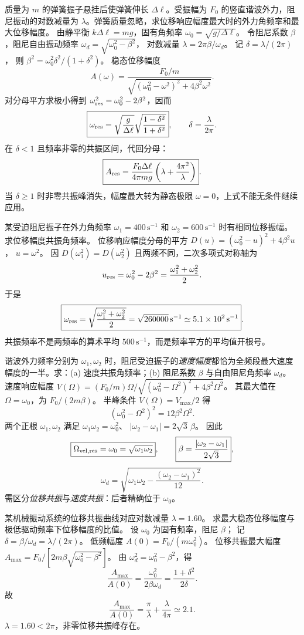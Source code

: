 质量为 $m$ 的弹簧振子悬挂后使弹簧伸长 $\Delta\ell$。受振幅为 $F_0$ 的竖直谐波外力，阻尼振动的对数减量为 $\lambda$。弹簧质量忽略，求位移响应幅度最大时的外力角频率和最大位移幅度。
\exsolution
由静平衡 $k\Delta\ell=mg$，固有角频率
$\omega_0=\sqrt{g/\Delta\ell}$。
令阻尼系数 $\beta$，阻尼自由振动频率
$\omega_d=\sqrt{\omega_0^2-\beta^2}$，
对数减量
$\lambda=2\pi\beta/\omega_d$。
记 $\delta=\lambda/(2\pi)$，
则
$\beta^2=\omega_0^2\delta^2/(1+\delta^2)$。
稳态位移幅度
\[
A(\omega)=\frac{F_0/m}
{\sqrt{(\omega_0^2-\omega^2)^2+4\beta^2\omega^2}}.
\]
对分母平方求极小得到
$\omega_{\rm res}^2=\omega_0^2-2\beta^2$，因而
\[
\boxed{\omega_{\rm res}=
\sqrt{\frac{g}{\Delta\ell}}
\sqrt{\frac{1-\delta^2}{1+\delta^2}}},
\qquad \delta=\frac{\lambda}{2\pi}.
\]
在 $\delta<1$ 且频率非零的共振区间，代回分母：
\[
\boxed{A_{\rm res}
=\frac{F_0\Delta\ell}{4\pi mg}
\left(\lambda+\frac{4\pi^2}{\lambda}\right)}.
\]
\excheck 当 $\delta\ge1$ 时非零共振峰消失，幅度最大转为静态极限 $\omega=0$，上式不能无条件继续应用。

某受迫阻尼振子在外力角频率 $\omega_1=400\,\mathrm{s^{-1}}$ 和
$\omega_2=600\,\mathrm{s^{-1}}$ 时有相同位移振幅。求位移幅度共振角频率。
\exsolution
位移响应幅度分母的平方
$D(u)=(\omega_0^2-u)^2+4\beta^2u$，
$u=\omega^2$。
因 $D(\omega_1^2)=D(\omega_2^2)$ 且两频不同，二次多项式对称轴为
\[
u_{\rm res}=\omega_0^2-2\beta^2
=\frac{\omega_1^2+\omega_2^2}{2}.
\]
于是
\[
\boxed{\omega_{\rm res}=
\sqrt{\frac{\omega_1^2+\omega_2^2}{2}}
=\sqrt{260000}\,\mathrm{s^{-1}}
\simeq5.1\times10^2\,\mathrm{s^{-1}}}.
\]
\excheck 共振频率不是两频率的算术平均 $500\,\mathrm{s^{-1}}$，而是频率平方的平均值开根号。

谐波外力频率分别为 $\omega_1,\omega_2$ 时，阻尼受迫振子的\emph{速度幅度}都恰为全频段最大速度幅度的一半。求：(a) 速度共振角频率；(b) 阻尼系数 $\beta$ 与自由阻尼角频率 $\omega_d$。
\exsolution
速度响应幅度
$V(\Omega)=(F_0/m)\Omega/
\sqrt{(\omega_0^2-\Omega^2)^2+4\beta^2\Omega^2}$。
其最大值在 $\Omega=\omega_0$，为 $F_0/(2m\beta)$。
半峰条件 $V(\Omega)=V_{\max}/2$ 得
\[
(\omega_0^2-\Omega^2)^2=12\beta^2\Omega^2.
\]
两个正根 $\omega_1,\omega_2$ 满足
$\omega_1\omega_2=\omega_0^2$、
$|\omega_2-\omega_1|=2\sqrt3\,\beta$。
因此
\[
\boxed{\Omega_{\rm vel,res}=\omega_0
=\sqrt{\omega_1\omega_2}},
\qquad
\boxed{\beta=\frac{|\omega_2-\omega_1|}{2\sqrt3}},
\]
\[
\boxed{\omega_d=
\sqrt{\omega_1\omega_2-
\frac{(\omega_2-\omega_1)^2}{12}}}.
\]
\excheck 需区分\emph{位移共振}与\emph{速度共振}：后者精确位于 $\omega_0$。

某机械振动系统的位移共振曲线对应对数减量
$\lambda=1.60$。
求最大稳态位移幅度与极低驱动频率下位移幅度的比值。
\exsolution
设 $\omega_0$ 为固有频率，阻尼 $\beta$；
记 $\delta=\beta/\omega_d=\lambda/(2\pi)$。
低频幅度
$A(0)=F_0/(m\omega_0^2)$。
位移共振最大幅度
$A_{\max}=F_0/[2m\beta\sqrt{\omega_0^2-\beta^2}]$。
由 $\omega_d^2=\omega_0^2-\beta^2$，得
\[
\frac{A_{\max}}{A(0)}
=\frac{\omega_0^2}{2\beta\omega_d}
=\frac{1+\delta^2}{2\delta}.
\]
故
\[
\boxed{\frac{A_{\max}}{A(0)}
=\frac{\pi}{\lambda}+\frac{\lambda}{4\pi}
\simeq2.1}.
\]
\excheck $\lambda=1.60<2\pi$，非零位移共振峰存在。


